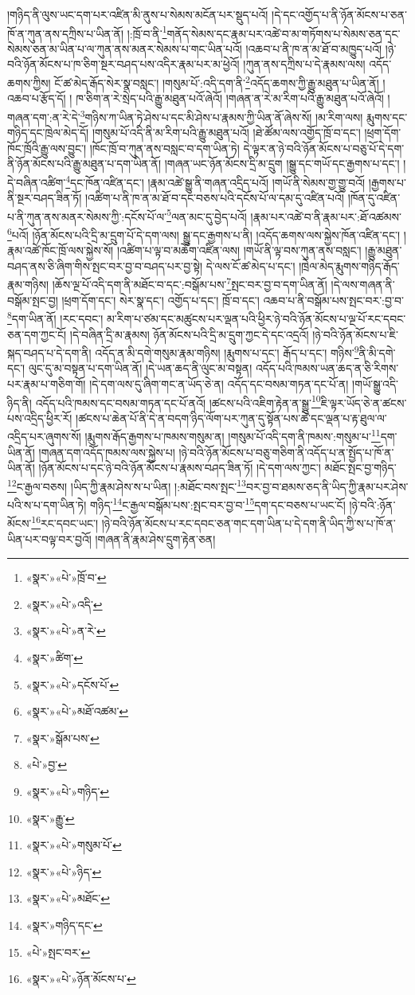 །གཉིད་ནི་ལུས་ཡང་དག་པར་འཛིན་མི་ནུས་པ་སེམས་མངོན་པར་སྡུད་པའོ། །དེ་དང་འགྱོད་པ་ནི་ཉོན་མོངས་པ་ཅན་ཁོ་ན་ཀུན་ནས་དཀྲིས་པ་ཡིན་ནོ། །:ཁྲོ་བ་ནི་\footnote{«སྣར་»«པེ་»ཁྲོ་བ་}གནོད་སེམས་དང་རྣམ་པར་འཚེ་བ་མ་གཏོགས་པ་སེམས་ཅན་དང་སེམས་ཅན་མ་ཡིན་པ་ལ་ཀུན་ནས་མནར་སེམས་པ་གང་ཡིན་པའོ། །འཆབ་པ་ནི་ཁ་ན་མ་ཐོ་བ་མཁྱུད་པའོ། །ཉེ་བའི་ཉོན་མོངས་པ་ཁ་ཅིག་སྔར་བཤད་པས་འདིར་རྣམ་པར་མ་ཕྱེའོ། །ཀུན་ནས་དཀྲིས་པ་དེ་རྣམས་ལས། འདོད་ཆགས་ཀྱིས། ངོ་ཚ་མེད་རྒོད་སེར་སྣ་བསླང་། །གསུམ་པོ་:འདི་དག་ནི་\footnote{«སྣར་»«པེ་»འདི་}འདོད་ཆགས་ཀྱི་རྒྱུ་མཐུན་པ་ཡིན་ནོ། །འཆབ་པ་རྩོད་དོ། །
ཁ་ཅིག་ན་རེ་སྲེད་པའི་རྒྱུ་མཐུན་པའོ་ཞེའོ། །གཞན་ན་རེ་མ་རིག་པའི་རྒྱུ་མཐུན་པའོ་ཞེའོ། །གཞན་དག་:ན་རེ་དེ་\footnote{«སྣར་»«པེ་»ན་རེ་}གཉིས་ཀ་ཡིན་ཏེ་ཤེས་པ་དང་མི་ཤེས་པ་རྣམས་ཀྱི་ཡིན་ནོ་ཞེས་སོ། །མ་རིག་ལས། རྨུགས་དང་གཉིད་དང་ཁྲེལ་མེད་དོ། །གསུམ་པོ་འདི་ནི་མ་རིག་པའི་རྒྱུ་མཐུན་པའོ། །ཐེ་ཚོམ་ལས་འགྱོད་ཁྲོ་བ་དང་། །ཕྲག་དོག་ཁོང་ཁྲོའི་རྒྱུ་ལས་བྱུང་། །ཁོང་ཁྲོ་བ་ཀུན་ནས་བསླང་བ་དག་ཡིན་ཏེ། དེ་ལྟར་ན་ཉེ་བའི་ཉོན་མོངས་པ་བཅུ་པོ་དེ་དག་ནི་ཉོན་མོངས་པའི་རྒྱུ་མཐུན་པ་དག་ཡིན་ནོ། །གཞན་ཡང་ཉོན་མོངས་དྲི་མ་དྲུག །སྒྱུ་དང་གཡོ་དང་རྒྱགས་པ་དང་། །དེ་བཞིན་འཚིག་\footnote{«སྣར་»ཚིག་}དང་ཁོན་འཛིན་དང་། །རྣམ་འཚེ་སྒྱུ་ནི་གཞན་འདྲིད་པའོ། །གཡོ་ནི་སེམས་གྱ་གྱུ་བའོ། །རྒྱགས་པ་ནི་སྔར་བཤད་ཟིན་ཏོ། །འཚིག་པ་ནི་ཁ་ན་མ་ཐོ་བ་དང་བཅས་པའི་དངོས་པོ་ལ་དམ་དུ་འཛིན་པའོ། །ཁོན་དུ་འཛིན་པ་ནི་ཀུན་ནས་མནར་སེམས་ཀྱི་:དངོས་པོ་ལ་\footnote{«སྣར་»«པེ་»དངོས་པོ་}ལན་མང་དུ་བྱེད་པའོ། །རྣམ་པར་འཚེ་བ་ནི་རྣམ་པར་:ཐོ་འཚམས་\footnote{«སྣར་»«པེ་»མཐོ་འཚམ་}པའོ། །ཉོན་མོངས་པའི་དྲི་མ་དྲུག་པོ་དེ་དག་ལས། སྒྱུ་དང་རྒྱགས་པ་ནི། །འདོད་ཆགས་ལས་སྐྱེས་ཁོན་འཛིན་དང་། །རྣམ་འཚེ་ཁོང་ཁྲོ་ལས་སྐྱེས་སོ། །འཚིག་པ་ལྟ་བ་མཆོག་འཛིན་ལས། །གཡོ་ནི་ལྟ་བས་ཀུན་ནས་བསླང་། །རྒྱུ་མཐུན་བཤད་ནས་ཅི་ཞིག་གིས་སྤང་བར་བྱ་བ་བཤད་པར་བྱ་སྟེ། དེ་ལས་ངོ་ཚ་མེད་པ་དང་། །ཁྲེལ་མེད་རྨུགས་གཉིད་རྒོད་རྣམ་གཉིས། །ཆོས་ལྔ་པོ་འདི་དག་ནི་མཐོང་བ་དང་:བསྒོམ་པས་\footnote{«སྣར་»སྒོམ་པས་}སྤང་བར་བྱ་བ་དག་ཡིན་ནོ། །དེ་ལས་གཞན་ནི་བསྒོམ་སྤང་བྱ། །ཕྲག་དོག་དང་། སེར་སྣ་དང་། འགྱོད་པ་དང་། ཁྲོ་བ་དང་། འཆབ་པ་ནི་བསྒོམ་པས་སྤང་བར་:བྱ་བ་\footnote{«པེ་»བྱ་}དག་ཡིན་ནོ། །རང་དབང་། མ་རིག་པ་ཙམ་དང་མཚུངས་པར་ལྡན་པའི་ཕྱིར་ཉེ་བའི་ཉོན་མོངས་པ་ལྔ་པོ་རང་དབང་ཅན་དག་ཀྱང་ངོ། །དེ་བཞིན་དྲི་མ་རྣམས། ཉོན་མོངས་པའི་དྲི་མ་དྲུག་ཀྱང་དེ་དང་འདྲའོ། །ཉེ་བའི་ཉོན་མོངས་པ་ཇི་སྐད་བཤད་པ་དེ་དག་ནི། འདོད་ན་མི་དགེ་གསུམ་རྣམ་གཉིས། །རྨུགས་པ་དང་། རྒོད་པ་དང་། གཉིས་\footnote{«སྣར་»«པེ་»གཉིད་}ནི་མི་དགེ་དང་། ལུང་དུ་མ་བསྟན་པ་དག་ཡིན་ནོ། །དེ་ཡན་ཆད་ནི་ལུང་མ་བསྟན། འདོད་པའི་ཁམས་ཡན་ཆད་ན་ཅི་རིགས་པར་རྣམ་པ་གཅིག་གོ། །དེ་དག་ལས་དུ་ཞིག་གང་ན་ཡོད་ཅེ་ན། འདོད་དང་བསམ་གཏན་དང་པོ་ན། །གཡོ་སྒྱུ་འདི་ཉིད་ནི། འདོད་པའི་ཁམས་དང་བསམ་གཏན་དང་པོ་ནའོ། །ཚངས་པའི་འཇིག་རྟེན་ན་སྒྱུ་\footnote{«སྣར་»རྒྱུ་}ཇི་ལྟར་ཡོད་ཅེ་ན་ཚངས་པས་འདྲིད་ཕྱིར་རོ། །ཚངས་པ་ཆེན་པོ་ནི་དེ་ན་བདག་ཉིད་ལོག་པར་ཀུན་དུ་སྟོན་པས་ཚེ་དང་ལྡན་པ་རྟ་ཐུལ་ལ་འདྲིད་པར་ཞུགས་སོ། །རྨུགས་རྒོད་རྒྱགས་པ་ཁམས་གསུམ་ན། །གསུམ་པོ་འདི་དག་ནི་ཁམས་:གསུམ་པ་\footnote{«སྣར་»«པེ་»གསུམ་པོ་}དག་ཡིན་ནོ། །གཞན་དག་འདོད་ཁམས་ལས་སྐྱེས་པ། །ཉེ་བའི་ཉོན་མོངས་པ་བཅུ་གཅིག་ནི་འདོད་པ་ན་སྤྱོད་པ་ཁོ་ན་ཡིན་ནོ། །ཉོན་མོངས་པ་དང་ཉེ་བའི་ཉོན་མོངས་པ་རྣམས་བཤད་ཟིན་ཏོ། །དེ་དག་ལས་ཀྱང་། མཐོང་སྤང་བྱ་གཉིད་\footnote{«སྣར་»«པེ་»ཉིད་}ང་རྒྱལ་བཅས། །ཡིད་ཀྱི་རྣམ་ཤེས་ས་པ་ཡིན། །:མཐོང་བས་སྤང་\footnote{«སྣར་»«པེ་»མཐོང་}བར་བྱ་བ་ཐམས་ཅད་ནི་ཡིད་ཀྱི་རྣམ་པར་ཤེས་པའི་ས་པ་དག་ཡིན་ཏེ། གཉིད་\footnote{«སྣར་»གཉིད་དང་}ང་རྒྱལ་བསྒོམ་པས་:སྤང་བར་བྱ་བ་\footnote{«པེ་»སྤང་བར་}དག་དང་བཅས་པ་ཡང་ངོ། །ཉེ་བའི་:ཉོན་མོངས་\footnote{«སྣར་»«པེ་»ཉོན་མོངས་པ་}རང་དབང་ཡང་། །ཉེ་བའི་ཉོན་མོངས་པ་རང་དབང་ཅན་གང་དག་ཡིན་པ་དེ་དག་ནི་ཡིད་ཀྱི་ས་པ་ཁོ་ན་ཡིན་པར་བལྟ་བར་བྱའོ། །གཞན་ནི་རྣམ་ཤེས་དྲུག་རྟེན་ཅན། 